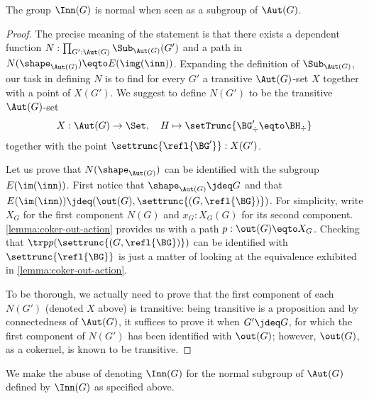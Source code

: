 \begin{lemma}
  The group $\Inn(G)$ is normal when seen as a subgroup of $\Aut(G)$.
\end{lemma}
\begin{proof}
  The precise meaning of the statement is that there exists a dependent function
  $N: \prod_{G':\Aut(G)} \Sub_{\Aut(G)}(G')$ and a path in
  $N(\sh_{\Aut(G)}) \eqto E(\img(\inn))$. Expanding the
  definition of $\Sub_{\Aut(G)}$, our task in defining $N$ is to find for every
  $G'$ a transitive $\Aut(G)$-set $X$ together with a point of $X(G')$. We
  suggest to define $N(G')$ to be the transitive $\Aut(G)$-set
  \begin{displaymath}
    X: \Aut(G) \to \Set,\quad H \mapsto \setTrunc{\BG'_\div \eqto \BH_\div}
  \end{displaymath}
  together with the point $\settrunc{\refl{\BG'}} : X(G')$.

  Let us prove that $N(\sh_{\Aut(G)})$ can be identified with the subgroup
  $E(\im(\inn))$. First notice that $\sh_{\Aut(G)} \jdeq G$ and that
  $E(\im(\inn)) \jdeq (\out(G),\settrunc{(G,\refl{\BG})})$. For simplicity,
  write $X_G$ for the first component $N(G)$ and $x_G: X_G(G)$ for its second
  component. \cref{lemma:coker-out-action} provides us with a path
  $p:\out(G) \eqto X_G$. Checking that $\trp p (\settrunc{(G,\refl{\BG})})$ can
  be identified with $\settrunc{\refl{\BG}}$ is just a matter of looking at the
  equivalence exhibited in \cref{lemma:coker-out-action}.


  To be thorough, we actually need to prove that the first component of each
  $N(G')$ (denoted $X$ above) is transitive: being transitive is a proposition
  and by connectedness of $\Aut(G)$, it suffices to prove it when $G'\jdeq G$,
  for which the first component of $N(G')$ has been identified with $\out(G)$;
  however, $\out(G)$, as a cokernel, is known to be transitive.
\end{proof}
We make the abuse of denoting $\Inn(G)$ for the normal subgroup of $\Aut(G)$
defined by $\Inn(G)$ as specified above.

